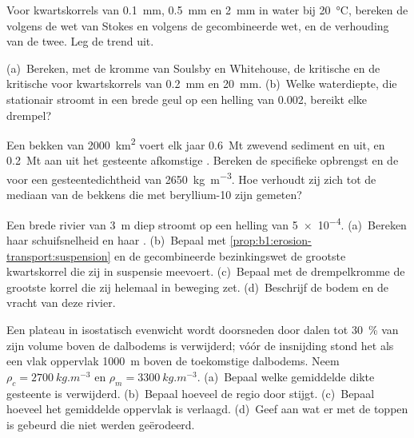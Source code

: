 \begin{exercise}[$\star\star$]\label{exo:b1:erosion-transport:7}
Voor kwartskorrels van \qty{0.1}{mm}, \qty{0.5}{mm} en \qty{2}{mm} in water bij \qty{20}{\celsius}, bereken de  volgens de wet van Stokes en volgens de gecombineerde wet, en de verhouding van de twee. Leg de trend uit.
\end{exercise}

\begin{exercise}[$\star\star$]\label{exo:b1:erosion-transport:8}
(a)~Bereken, met de kromme van Soulsby en Whitehouse, de kritische  en de kritische  voor kwartskorrels van \qty{0.2}{mm} en \qty{20}{mm}. (b)~Welke waterdiepte, die stationair stroomt in een brede geul op een helling van \num{0.002}, bereikt elke drempel?
\end{exercise}

\begin{exercise}[$\star\star$]\label{exo:b1:erosion-transport:9}
Een bekken van \qty{2000}{km^2} voert elk jaar \qty{0.6}{Mt} zwevend sediment en  uit, en \qty{0.2}{Mt} aan uit het gesteente afkomstige . Bereken de specifieke opbrengst en de  voor een gesteentedichtheid van \qty{2650}{kg.m^{-3}}. Hoe verhoudt zij zich tot de mediaan van de bekkens die met beryllium-10 zijn gemeten?
\end{exercise}

\begin{exercise}[$\star\star\star$]\label{exo:b1:erosion-transport:10}
Een brede rivier van \qty{3}{m} diep stroomt op een helling van \num{5e-4}. (a)~Bereken haar schuifsnelheid en haar . (b)~Bepaal met \cref{prop:b1:erosion-transport:suspension} en de gecombineerde bezinkingswet de grootste kwartskorrel die zij in suspensie meevoert. (c)~Bepaal met de drempelkromme de grootste korrel die zij helemaal in beweging zet. (d)~Beschrijf de bodem en de vracht van deze rivier.
\end{exercise}

\begin{exercise}[$\star\star\star$]\label{exo:b1:erosion-transport:11}
Een plateau in isostatisch evenwicht wordt doorsneden door dalen tot \qty{30}{\percent} van zijn volume boven de dalbodems is verwijderd; vóór de insnijding stond het als een vlak oppervlak \qty{1000}{m} boven de toekomstige dalbodems. Neem $\rho_c = \qty{2700}{kg.m^{-3}}$ en $\rho_m = \qty{3300}{kg.m^{-3}}$. (a)~Bepaal welke gemiddelde dikte gesteente is verwijderd. (b)~Bepaal hoeveel de regio door  stijgt. (c)~Bepaal hoeveel het gemiddelde oppervlak is verlaagd. (d)~Geef aan wat er met de toppen is gebeurd die niet werden geërodeerd.
\end{exercise}

